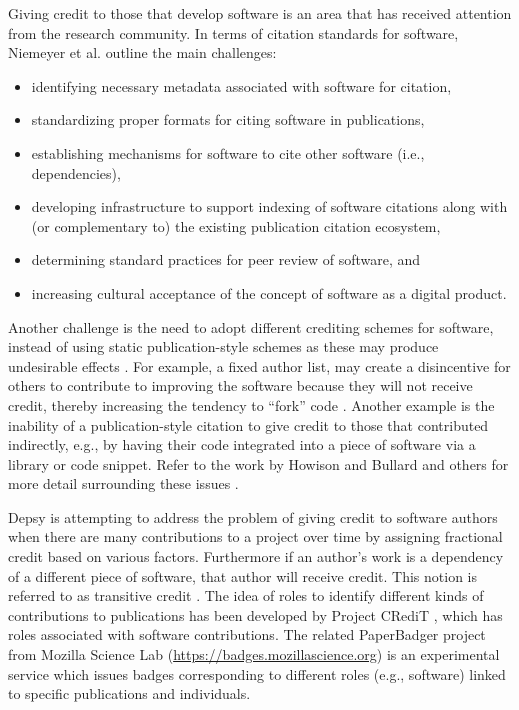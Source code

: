 \documentclass[letterpaper,11pt]{article}
\begin{document}
Giving credit to those that develop software is an area that has received attention from the research community. In terms of citation standards for software, Niemeyer et al. \citep{niemeyer2016} outline the main challenges:
\begin{itemize}
	\item identifying necessary metadata associated with software for citation,
	\item standardizing proper formats for citing software in publications,
	\item establishing mechanisms for software to cite other software (i.e., dependencies),
	\item developing infrastructure to support indexing of software citations along with (or complementary to) the existing publication citation ecosystem,
	\item determining standard practices for peer review of software, and
	\item increasing cultural acceptance of the concept of software as a digital product.
\end{itemize}

Another challenge is the need to adopt different crediting schemes for software, instead of using static publication-style schemes as these may produce undesirable effects \citep{howison2015}. For example, a fixed author list, may create a disincentive for others to contribute to improving the software because they will not receive credit, thereby increasing the tendency to ``fork'' code \citep{howison2013}. Another example is the inability of a publication-style citation to give credit to those that contributed indirectly, e.g., by having their code integrated into a piece of software via a library or code snippet. Refer to the work by Howison and Bullard and others for more detail surrounding these issues \citep{howison2011,howison2013,howison2015}.

Depsy \citep{piwowar2016} is attempting to address the problem of giving credit to software authors when there are many contributions to a project over time by assigning fractional credit based on various factors. Furthermore if an author's work is a dependency of a different piece of software, that author will receive credit. This notion is referred to as transitive credit \citep{katz2014}. The idea of roles to identify different kinds of contributions to publications has been developed by Project CRediT \citep{brand2015}, which has roles associated with software contributions. The related PaperBadger project from Mozilla Science Lab (\url{https://badges.mozillascience.org}) is an experimental service which issues badges corresponding to different roles (e.g., software) linked to specific publications and individuals.
\end{document}
